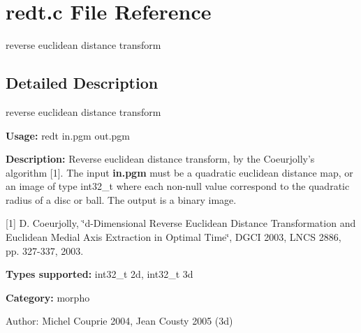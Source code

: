 \section{redt.c File Reference}
\label{redt_8c}
reverse euclidean distance transform  




\label{_details}
\subsection{Detailed Description}
reverse euclidean distance transform 

{\bf Usage:} redt in.pgm out.pgm

{\bf Description:} Reverse euclidean distance transform, by the Coeurjolly's algorithm [1]. The input {\bf in.pgm} must be a quadratic euclidean distance map, or an image of type int32\_\-t where each non-null value correspond to the quadratic radius of a disc or ball. The output is a binary image.

[1] D. Coeurjolly, \char`\"{}d-Dimensional Reverse Euclidean Distance Transformation and Euclidean Medial Axis Extraction in Optimal Time\char`\"{}, DGCI 2003, LNCS 2886, pp. 327-337, 2003.

{\bf Types supported:} int32\_\-t 2d, int32\_\-t 3d

{\bf Category:} morpho

\begin{Desc}
\item[Author:]Michel Couprie 2004, Jean Cousty 2005 (3d) \end{Desc}

